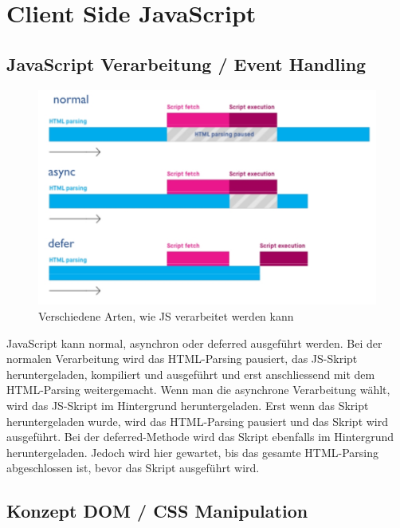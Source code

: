\documentclass[a4paper, 11pt]{article}
\begin{document}
\section{Client Side JavaScript}
\subsection{JavaScript Verarbeitung / Event Handling}
\begin{figure}
	\centering
	\includegraphics[keepaspectratio=true,height=15\baselineskip]{js_ausfuehrung.jpg}
	\caption{Verschiedene Arten, wie JS verarbeitet werden kann}
	\label{fig:rel}
\end{figure}
JavaScript kann normal, asynchron oder deferred ausgeführt werden. Bei der normalen Verarbeitung wird das HTML-Parsing pausiert, das JS-Skript heruntergeladen, kompiliert und ausgeführt und erst anschliessend mit dem HTML-Parsing weitergemacht. Wenn man die asynchrone Verarbeitung wählt, wird das JS-Skript im Hintergrund heruntergeladen. Erst wenn das Skript heruntergeladen wurde, wird das HTML-Parsing pausiert und das Skript wird ausgeführt. Bei der deferred-Methode wird das Skript ebenfalls im Hintergrund heruntergeladen. Jedoch wird hier gewartet, bis das gesamte HTML-Parsing abgeschlossen ist, bevor das Skript ausgeführt wird.

\subsection{Konzept DOM / CSS Manipulation}
\end{document}
